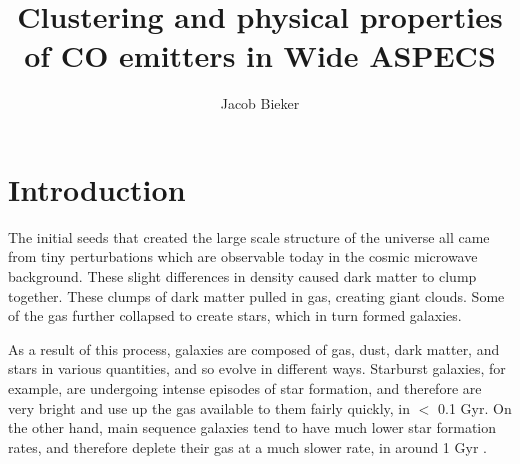 \documentclass[twoside,single]{lion-msc}
\title{Clustering and physical properties of CO emitters in Wide ASPECS}
\author{Jacob Bieker}
\affiliation{Leiden Observatory, Leiden University}
\begin{document}
\maketitle

\setcounter{page}{2}
\tableofcontents
\cleardoublepage

\setcounter{page}{1}
\chapter{Introduction}






The initial seeds that created the large scale structure of the universe all came from tiny perturbations which are observable today in the cosmic microwave background. These slight differences in density caused dark matter to clump together. These clumps of dark matter pulled in gas, creating giant clouds. Some of the gas further collapsed to create stars, which in turn formed galaxies.

As a result of this process, galaxies are composed of gas, dust, dark matter, and stars in various quantities, and so evolve in different ways. Starburst galaxies, for example, are undergoing intense episodes of star formation, and therefore are very bright and use up the gas available to them fairly quickly, in $<$ 0.1 Gyr. On the other hand, main sequence galaxies tend to have much lower star formation rates, and therefore deplete their gas at a much slower rate, in around 1 Gyr \cite{scoville2017evolution, silverman2015higher}.
\end{document}
